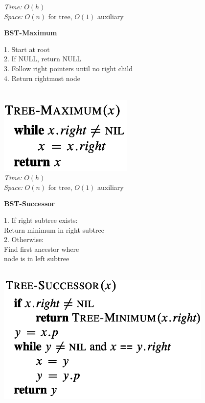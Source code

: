 {\begin{minipage}[t]{1\textwidth}
\begin{minipage}[t]{0.19\textwidth}
        \textit{Time:} \(O(h)\)\\
        \textit{Space:} \(O(n)\) for tree, \(O(1)\) auxiliary
    \end{minipage}
    \hfill
    \begin{minipage}[t]{0.19\textwidth}
        \centering
        \textbf{\scriptsize BST-Maximum}\\[2pt]
        \scriptsize
        \begin{minipage}[t]{\textwidth}
            \scriptsize
            1. Start at root\\
            2. If NULL, return NULL\\
            3. Follow right pointers until no right child\\
            4. Return rightmost node
        \end{minipage}\\[8pt]
        \includegraphics[width=0.5\textwidth]{images/bst-maximum.png}\\[2pt]
        \textit{Time:} \(O(h)\)\\
        \textit{Space:} \(O(n)\) for tree, \(O(1)\) auxiliary
    \end{minipage}
    \hfill
    \begin{minipage}[t]{0.19\textwidth}
        \centering
        \textbf{\scriptsize BST-Successor}\\[2pt]
        \scriptsize
        \begin{minipage}[t]{\textwidth}
            \scriptsize
            1. If right subtree exists:\\
            \quad Return minimum in right subtree\\
            2. Otherwise:\\
            \quad Find first ancestor where\\
            \quad node is in left subtree
        \end{minipage}\\[4pt]
        \includegraphics[width=0.8\textwidth]{images/bst-successor.png}\\[2pt]

\end{minipage}
\end{minipage}}
